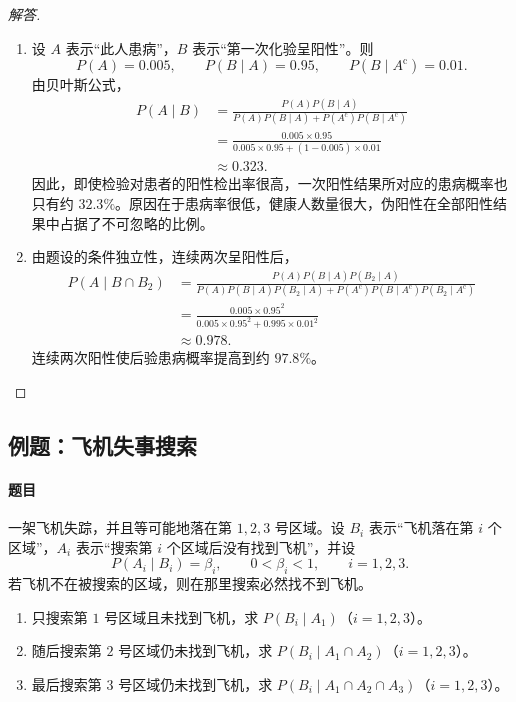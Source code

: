 \begin{proof}[解答]
\begin{enumerate}
\item 设 $A$ 表示“此人患病”，$B$ 表示“第一次化验呈阳性”。则
\[
P(A)=0.005,
\qquad
P(B\mid A)=0.95,
\qquad
P(B\mid A^{\mathrm c})=0.01.
\]
由贝叶斯公式，
\[
\begin{aligned}
P(A\mid B)
&=\frac{P(A)P(B\mid A)}
{P(A)P(B\mid A)+P(A^{\mathrm c})P(B\mid A^{\mathrm c})}\\
&=\frac{0.005\times0.95}
{0.005\times0.95+(1-0.005)\times0.01}\\
&\approx0.323.
\end{aligned}
\]
因此，即使检验对患者的阳性检出率很高，一次阳性结果所对应的患病概率也只有约 $32.3\%$。原因在于患病率很低，健康人数量很大，伪阳性在全部阳性结果中占据了不可忽略的比例。
\item 由题设的条件独立性，连续两次呈阳性后，
\[
\begin{aligned}
P(A\mid B\cap B_2)
&=\frac{P(A)P(B\mid A)P(B_2\mid A)}
{P(A)P(B\mid A)P(B_2\mid A)
+P(A^{\mathrm c})P(B\mid A^{\mathrm c})P(B_2\mid A^{\mathrm c})}\\
&=\frac{0.005\times0.95^2}
{0.005\times0.95^2+0.995\times0.01^2}\\
&\approx0.978.
\end{aligned}
\]
连续两次阳性使后验患病概率提高到约 $97.8\%$。
\end{enumerate}
\end{proof}

\subsection{例题：飞机失事搜索}\label{note:c1:e22}
\paragraph{题目}
一架飞机失踪，并且等可能地落在第 $1,2,3$ 号区域。设 $B_i$ 表示“飞机落在第 $i$ 个区域”，$A_i$ 表示“搜索第 $i$ 个区域后没有找到飞机”，并设
\[
P(A_i\mid B_i)=\beta_i,
\qquad 0<\beta_i<1,
\qquad i=1,2,3.
\]
若飞机不在被搜索的区域，则在那里搜索必然找不到飞机。

\begin{enumerate}
\item 只搜索第 $1$ 号区域且未找到飞机，求 $P(B_i\mid A_1)$（$i=1,2,3$）。
\item 随后搜索第 $2$ 号区域仍未找到飞机，求 $P(B_i\mid A_1\cap A_2)$（$i=1,2,3$）。
\item 最后搜索第 $3$ 号区域仍未找到飞机，求 $P(B_i\mid A_1\cap A_2\cap A_3)$（$i=1,2,3$）。
\end{enumerate}

